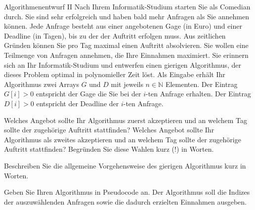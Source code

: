 \documentclass{article}
\begin{document}
\begin{eexercises}{Algorithmenentwurf II}{
    Nach Ihrem Informatik-Studium starten Sie als Comedian durch. Sie sind sehr erfolgreich und haben bald mehr Anfragen als Sie annehmen können. Jede Anfrage besteht aus einer angebotenen Gage (in Euro) und einer Deadline (in Tagen), bis zu der der Auftritt erfolgen muss. Aus zeitlichen Gründen können Sie pro Tag maximal einen Auftritt absolvieren. Sie wollen eine Teilmenge von Anfragen annehmen, die Ihre Einnahmen maximiert. Sie erinnern sich an Ihr Informatik-Studium und entwerfen einen gierigen Algorithmus, der dieses Problem optimal in polynomieller Zeit löst. Als Eingabe erhält Ihr Algorithmus zwei Arrays $G$ und $D$ mit jeweils $n \in \mathbb{N}$ Elementen. Der Eintrag $G[i] > 0$ entspricht der Gage die Sie bei der $i$-ten Anfrage erhalten. Der Eintrag $D[i] > 0$ entspricht der Deadline der $i$-ten Anfrage.
  }
  \item Welches Angebot sollte Ihr Algorithmus zuerst akzeptieren und an welchem Tag sollte der zugehörige Auftritt stattfinden? Welches Angebot sollte Ihr Algorithmus als zweites akzeptieren und an welchem Tag sollte der zugehörige Auftritt stattfinden? Begründen Sie diese Wahlen kurz (!) in Worten.
  \item Beschreiben Sie die allgemeine Vorgehensweise des gierigen Algorithmus kurz in Worten.
  \item Geben Sie Ihren Algorithmus in Pseudocode an. Der Algorithmus soll die Indizes der auszuwählenden Anfragen sowie die dadurch erzielten Einnahmen ausgeben.
\end{eexercises}
\end{document}
